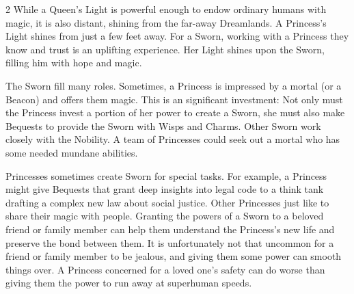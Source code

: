 \begin{multicols}{2}
While a Queen's Light is powerful enough to endow ordinary humans with magic, it is also distant, shining from the far-away Dreamlands. A Princess's Light shines from just a few feet away. For a Sworn, working with a Princess they know and trust is an uplifting experience. Her Light shines upon the Sworn, filling him with hope and magic.

The Sworn fill many roles. Sometimes, a Princess is impressed by a mortal (or a Beacon) and offers them magic. This is an significant investment: Not only must the Princess invest a portion of her power to create a Sworn, she must also make Bequests to provide the Sworn with Wisps and Charms. Other Sworn work closely with the Nobility. A team of Princesses could seek out a mortal who has some needed mundane abilities. 

Princesses sometimes create Sworn for special tasks. For example, a Princess might give Bequests that grant deep insights into legal code to a think tank drafting a complex new law about social justice. 
Other Princesses just like to share their magic with people. Granting the powers of a Sworn to a beloved friend or family member can help them understand the Princess’s new life and preserve the bond between them. It is unfortunately not that uncommon for a friend or family member to be jealous, and giving them some power can smooth things over. A Princess concerned for a loved one’s safety can do worse than giving them the power to run away at superhuman speeds.


\end{multicols}
